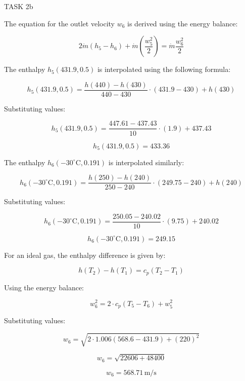 TASK 2b

The equation for the outlet velocity \( w_6 \) is derived using the energy balance:

\[
2 \dot{m} (h_5 - h_6) + \dot{m} \left( \frac{w_5^2}{2} \right) = \dot{m} \frac{w_6^2}{2}
\]

The enthalpy \( h_5(431.9, 0.5) \) is interpolated using the following formula:

\[
h_5(431.9, 0.5) = \frac{h(440) - h(430)}{440 - 430} \cdot (431.9 - 430) + h(430)
\]

Substituting values:

\[
h_5(431.9, 0.5) = \frac{447.61 - 437.43}{10} \cdot (1.9) + 437.43
\]

\[
h_5(431.9, 0.5) = 433.36
\]

The enthalpy \( h_6(-30^\circ\text{C}, 0.191) \) is interpolated similarly:

\[
h_6(-30^\circ\text{C}, 0.191) = \frac{h(250) - h(240)}{250 - 240} \cdot (249.75 - 240) + h(240)
\]

Substituting values:

\[
h_6(-30^\circ\text{C}, 0.191) = \frac{250.05 - 240.02}{10} \cdot (9.75) + 240.02
\]

\[
h_6(-30^\circ\text{C}, 0.191) = 249.15
\]

For an ideal gas, the enthalpy difference is given by:

\[
h(T_2) - h(T_1) = c_p (T_2 - T_1)
\]

Using the energy balance:

\[
w_6^2 = 2 \cdot c_p (T_5 - T_6) + w_5^2
\]

Substituting values:

\[
w_6 = \sqrt{2 \cdot 1.006 (568.6 - 431.9) + (220)^2}
\]

\[
w_6 = \sqrt{22606 + 48400}
\]

\[
w_6 = 568.71 \, \text{m/s}
\]